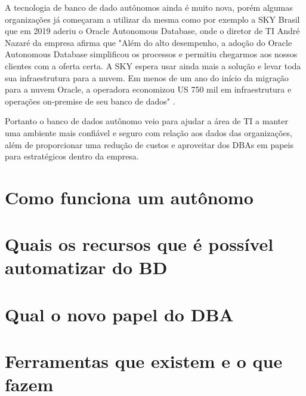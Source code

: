 A tecnologia de banco de dado autônomos ainda é muito nova, porém algumas organizações já começaram a utilizar da mesma como por exemplo a SKY Brasil que em 2019 aderiu o Oracle Autonomous Database, onde o diretor de TI André Nazaré da empresa afirma que "Além do alto desempenho, a adoção do Oracle Autonomous Database simplificou os processos e permitiu chegarmos aos nossos clientes com a oferta certa. A SKY espera usar ainda mais a solução e levar toda sua infraestrutura para a nuvem. Em menos de um ano do início da migração para a nuvem Oracle, a operadora economizou US 750 mil em infraestrutura e operações on-premise de seu banco de dados" . \cite{Sky}

Portanto o banco de dados autônomo veio para ajudar a área de TI a manter uma ambiente mais confiável e seguro com relação aos dados das organizações, além de proporcionar uma redução de custos e aproveitar dos DBAs em papeis para estratégicos dentro da empresa.



\section{Como funciona um autônomo}

\lipsum[1-2]

\lipsum[10-12]
\lipsum[10-12]

\section{Quais os recursos que é possível automatizar do BD}

\lipsum[1-2]

\lipsum[10-12]
\lipsum[10-12]
\lipsum[10-12]




\section{Qual o novo papel do DBA}

\lipsum[1-2]


\section{Ferramentas que existem e o que fazem}

\lipsum[1-20]

